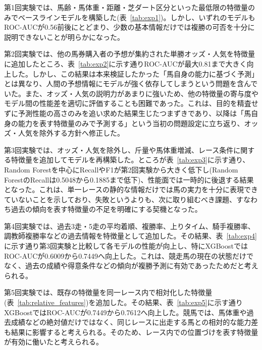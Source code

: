 \documentclass[dvipdfmx, a4paper, 11pt, titlepage]{jsarticle}
\begin{document}
第1回実験では、馬齢・馬体重・距離・芝ダート区分といった最低限の特徴量のみでベースラインモデルを構築した(表~\ref{tab:exp1})。しかし、いずれのモデルもROC-AUCが0.56前後にとどまり、少数の基本情報だけでは複勝の可否を十分に説明できないことが明らかになった。

第2回実験では、他の馬券購入者の予想が集約された単勝オッズ・人気を特徴量に追加したところ、表~\ref{tab:exp2}に示す通りROC-AUCが最大0.81まで大きく向上した。しかし、この結果は本来検証したかった「馬自身の能力に基づく予測」とは異なり、人間の予想情報にモデルが強く依存してしまうという問題を含んでいた。また、オッズ・人気の説明力があまりに強いため、他の特徴量の寄与度やモデル間の性能差を適切に評価することも困難であった。これは、目的を精査せずに予測性能の高さのみを追い求めた結果生じたつまずきであり、以降は「馬自身の能力を表す特徴量のみで予測する」という当初の問題設定に立ち返り、オッズ・人気を除外する方針へ修正した。

第3回実験では、オッズ・人気を除外し、斤量や馬体重増減、レース条件に関する特徴量を追加してモデルを再構築した。ところが表~\ref{tab:exp3}に示す通り、Random Forestを中心にRecallやF1が第2回実験から大きく低下し(Random ForestのRecallは0.5048から0.1885まで低下)、性能面では一時的に後退する結果となった。これは、単一レースの静的な情報だけでは馬の実力を十分に表現できていないことを示しており、失敗というよりも、次に取り組むべき課題、すなわち過去の傾向を表す特徴量の不足を明確にする契機となった。

第4回実験では、過去3走・5走の平均着順、複勝率、上りタイム、騎手複勝率、調教師複勝率などの過去情報を特徴量として追加した。その結果、表~\ref{tab:exp4}に示す通り第3回実験と比較して各モデルの性能が向上し、特にXGBoostではROC-AUCが0.6009から0.7449へ向上した。これは、競走馬の現在の状態だけでなく、過去の成績や得意条件などの傾向が複勝予測に有効であったためだと考えられる。

第5回実験では、既存の特徴量を同一レース内で相対化した特徴量(表~\ref{tab:relative_features})を追加した。その結果、表~\ref{tab:exp5}に示す通りXGBoostではROC-AUCが0.7449から0.7612へ向上した。競馬では、馬体重や過去成績などの絶対値だけではなく、同じレースに出走する馬との相対的な能力差も結果に影響すると考えられる。そのため、レース内での位置づけを表す特徴量が有効に働いたと考えられる。
\end{document}
